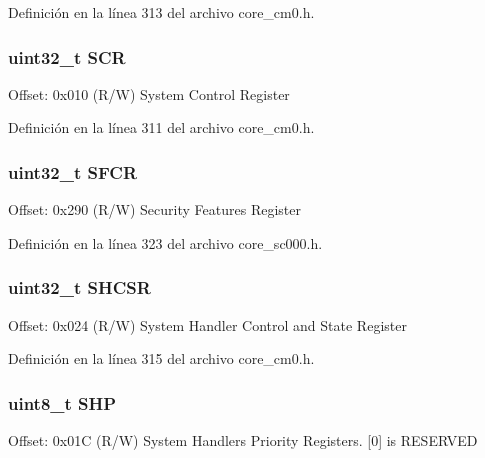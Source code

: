 Definición en la línea 313 del archivo core\+\_\+cm0.\+h.

\subsubsection[{\texorpdfstring{S\+CR}{SCR}}]{ uint32\+\_\+t S\+CR}\hypertarget{struct_s_c_b___type_a64a95891ad3e904dd5548112539c1c98}{}\label{struct_s_c_b___type_a64a95891ad3e904dd5548112539c1c98}
Offset\+: 0x010 (R/W) System Control Register 

Definición en la línea 311 del archivo core\+\_\+cm0.\+h.

\subsubsection[{\texorpdfstring{S\+F\+CR}{SFCR}}]{ uint32\+\_\+t S\+F\+CR}\hypertarget{struct_s_c_b___type_aa71bce1c6b3b85a1625a4bf040db7234}{}\label{struct_s_c_b___type_aa71bce1c6b3b85a1625a4bf040db7234}
Offset\+: 0x290 (R/W) Security Features Register 

Definición en la línea 323 del archivo core\+\_\+sc000.\+h.

\subsubsection[{\texorpdfstring{S\+H\+C\+SR}{SHCSR}}]{ uint32\+\_\+t S\+H\+C\+SR}\hypertarget{struct_s_c_b___type_a04d136e5436e5fa2fb2aaa78a5f86b19}{}\label{struct_s_c_b___type_a04d136e5436e5fa2fb2aaa78a5f86b19}
Offset\+: 0x024 (R/W) System Handler Control and State Register 

Definición en la línea 315 del archivo core\+\_\+cm0.\+h.

\subsubsection[{\texorpdfstring{S\+HP}{SHP}}]{ uint8\+\_\+t S\+HP}\hypertarget{struct_s_c_b___type_af6c413ed8c7d1b792a91f01e13b47adf}{}\label{struct_s_c_b___type_af6c413ed8c7d1b792a91f01e13b47adf}
Offset\+: 0x01C (R/W) System Handlers Priority Registers. \mbox{[}0\mbox{]} is R\+E\+S\+E\+R\+V\+ED


